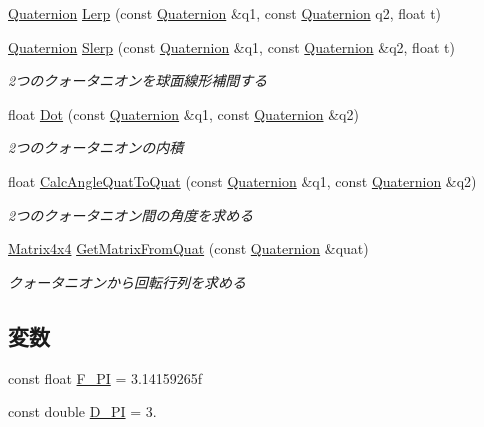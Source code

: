\begin{DoxyCompactItemize}
\item 
\mbox{\hyperlink{struct_math_1_1_quaternion}{Quaternion}} \mbox{\hyperlink{namespace_math_a2ceb0ab69bdfd0752989983241d1055e}{Lerp}} (const \mbox{\hyperlink{struct_math_1_1_quaternion}{Quaternion}} \&q1, const \mbox{\hyperlink{struct_math_1_1_quaternion}{Quaternion}} q2, float t)
\item 
\mbox{\hyperlink{struct_math_1_1_quaternion}{Quaternion}} \mbox{\hyperlink{namespace_math_a718b7874df36cd0c5a220f6404c315f8}{Slerp}} (const \mbox{\hyperlink{struct_math_1_1_quaternion}{Quaternion}} \&q1, const \mbox{\hyperlink{struct_math_1_1_quaternion}{Quaternion}} \&q2, float t)
\begin{DoxyCompactList}\small\item\em 2つのクォータニオンを球面線形補間する \end{DoxyCompactList}\item 
float \mbox{\hyperlink{namespace_math_af75856a56466e76f5c6308cc78eab656}{Dot}} (const \mbox{\hyperlink{struct_math_1_1_quaternion}{Quaternion}} \&q1, const \mbox{\hyperlink{struct_math_1_1_quaternion}{Quaternion}} \&q2)
\begin{DoxyCompactList}\small\item\em 2つのクォータニオンの内積 \end{DoxyCompactList}\item 
float \mbox{\hyperlink{namespace_math_a573c0790a83c7b0056ade0534c3c26e5}{Calc\+Angle\+Quat\+To\+Quat}} (const \mbox{\hyperlink{struct_math_1_1_quaternion}{Quaternion}} \&q1, const \mbox{\hyperlink{struct_math_1_1_quaternion}{Quaternion}} \&q2)
\begin{DoxyCompactList}\small\item\em 2つのクォータニオン間の角度を求める \end{DoxyCompactList}\item 
\mbox{\hyperlink{struct_math_1_1_matrix4x4}{Matrix4x4}} \mbox{\hyperlink{namespace_math_aac3705a108d796688a41340d99852f2e}{Get\+Matrix\+From\+Quat}} (const \mbox{\hyperlink{struct_math_1_1_quaternion}{Quaternion}} \&quat)
\begin{DoxyCompactList}\small\item\em クォータニオンから回転行列を求める \end{DoxyCompactList}\end{DoxyCompactItemize}
\subsection*{変数}
\begin{DoxyCompactItemize}
\item 
const float \mbox{\hyperlink{namespace_math_aa0985dc913fcb7d0b29f057d46a0a285}{F\+\_\+\+PI}} = 3.\+14159265f
\item 
const double \mbox{\hyperlink{namespace_math_a443fa0e652be63da57292b24faba00da}{D\+\_\+\+PI}} = 3.
\end{DoxyCompactItemize}


